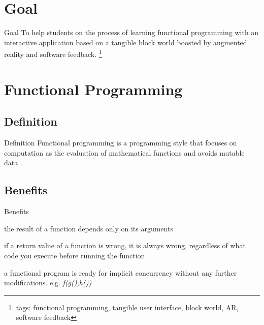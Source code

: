 \section{Goal}

\begin{frame}{Goal}
To help students on the process of learning functional programming with an
interactive application based on a tangible block world boosted by augmented
reality and software feedback.
\footnote{tags: functional programming, tangible user interface, block world,
AR, software feedback}
\end{frame}



\section{Functional Programming}

\subsection {Definition}
\begin{frame} {Definition}
Functional programming is a programming style that focuses on computation as the
evaluation of mathematical functions and avoids mutable data
\cite{wikipedia_functional_programming}.
\end{frame}

\subsection {Benefits}
\begin{frame} {Benefits}
\begin{description}
\pause \item [Unit Testing] the result of a function depends only on its
arguments
\pause \item [Debugging] if a return value of a function is wrong, it is always
wrong, regardless of what code you execute before running the function
\pause \item [Concurrency] a functional program is ready for implicit
concurrency without any further modifications. e.g. \emph{ f(g(),h()) }
\pause \item [Hot Code Deployment]
\pause \item [Machine Assisted Proofs and Optimizations]
\end{description}
\end{frame}

